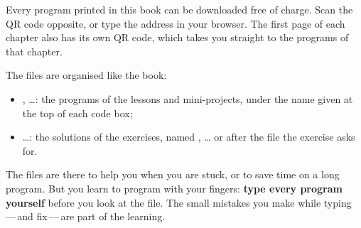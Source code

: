 
\noindent\begin{minipage}[t]{\dimexpr\linewidth-52mm\relax}\vspace{0pt}
Every program printed in this book can be downloaded free of charge. Scan the QR code opposite, or
type the address \textbf{\otCodeAffiche} in your browser. The first page of each chapter also has
its own QR code, which takes you straight to the programs of that chapter.\par\vspace{3mm}
The files are organised like the book:
\begin{itemize}
\item {}, \ldots: the programs of the lessons and
  mini-projects, under the name given at the top of each code box;
\item {}\ldots: the solutions of the exercises, named
  , \ldots{} or after the file the exercise asks for.
\end{itemize}
\end{minipage}\hfill
\begin{minipage}[t]{46mm}\vspace{0pt}
\begin{tcolorbox}[enhanced,colback=otNavyTint,colframe=otNavyTint,arc=2mm,left=3.5mm,right=3.5mm,
    top=3.5mm,bottom=3.5mm,boxsep=0pt,before skip=0pt,after skip=0pt,halign=center]
  \par\vspace{1.2mm}
  {\otSemi\fontsize{7}{8.5}\selectfont\color{otNavy}}\par\vspace{2.4mm}
  {\color{otInk}\edef\otTmpQR{\noexpand\qrcode[height=24mm,level=M]{\otCodeBase}}\otTmpQR}\par\vspace{1.6mm}
  {\otRegular\fontsize{8}{10}\selectfont\color{otMuted}\otCodeAffiche}
\end{tcolorbox}
\end{minipage}

\begin{attention}
The files are there to help you when you are stuck, or to save time on a long program. But you learn
to program with your fingers: \textbf{type every program yourself} before you look at the file. The
small mistakes you make while typing\,---\,and fix\,---\,are part of the learning.
\end{attention}

